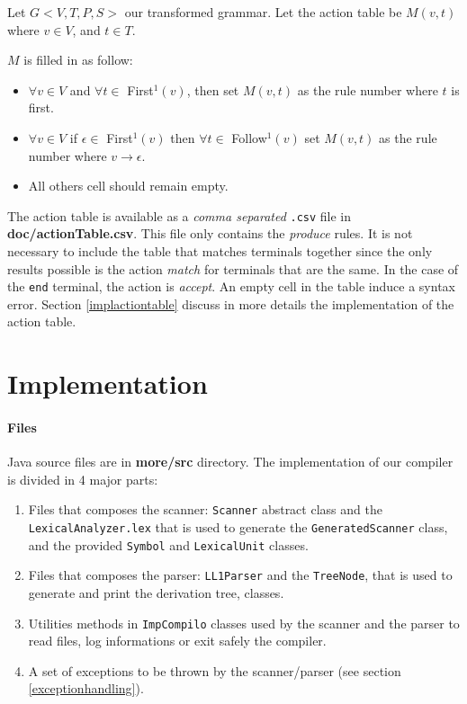 \documentclass[letterpaper]{article}
\begin{document}
Let $G<V, T, P, S>$ our transformed grammar.
Let the action table be $M(v, t)$ where
$v \in V$, and $t \in T$.

$M$ is filled in as follow:
\begin{itemize}
    \item $\forall v \in V$ and $\forall t \in$ First$^1(v)$,
    then set $M(v, t)$ as the rule number where $t$ is first.
    \item $\forall v \in V$ if $\epsilon \in $ First$^1(v)$ then
    $\forall t \in$ Follow$^1(v)$ set $M(v, t)$ as the rule number
    where $v \rightarrow \epsilon$.
    \item All others cell should remain empty.
\end{itemize}

The action table is available as a
\textit{comma separated} \texttt{.csv} file in
\textbf{doc/actionTable.csv}. This file only contains the
\textit{produce} rules.
It is not necessary to include the table that matches terminals together
since the only results possible is the action \textit{match}
for terminals that are the same.
In the case of the \texttt{end} terminal, the action is \textit{accept}.
An empty cell in the table induce a syntax error.
Section \ref{implactiontable} discuss in more details the implementation
of the action table.

\section{Implementation}


\paragraph{Files} Java source files are in \textbf{more/src} directory.
The implementation of our compiler is divided in 4 major
parts:
\begin{enumerate}
    \item Files that composes the scanner: \texttt{Scanner} abstract
    class and the \texttt{LexicalAnalyzer.lex} that is used to generate
    the \texttt{GeneratedScanner} class, and
    the provided \texttt{Symbol} and \texttt{LexicalUnit} classes.
    \item Files that composes the parser: \texttt{LL1Parser}
    and the \texttt{TreeNode}, that is used to generate and print
    the derivation tree, classes.
    \item Utilities methods in \texttt{ImpCompilo} classes
    used by the scanner and the parser to read
    files, log informations or exit safely the compiler.
    \item A set of exceptions to be thrown by the scanner/parser (see section
    \ref{exceptionhandling}).
\end{enumerate}
\end{document}
